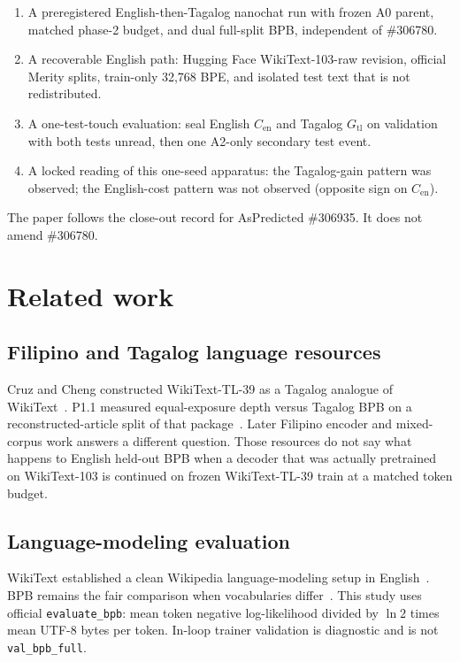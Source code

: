 \documentclass[11pt,a4paper]{article}
\begin{document}
\begin{enumerate}
\item A preregistered English-then-Tagalog nanochat run with frozen A0 parent, matched phase-2 budget, and dual full-split BPB, independent of \#306780.
\item A recoverable English path: Hugging Face WikiText-103-raw revision, official Merity splits, train-only 32{,}768 BPE, and isolated test text that is not redistributed.
\item A one-test-touch evaluation: seal English $C_{\mathrm{en}}$ and Tagalog $G_{\mathrm{tl}}$ on validation with both tests unread, then one A2-only secondary test event.
\item A locked reading of this one-seed apparatus: the Tagalog-gain pattern was observed; the English-cost pattern was not observed (opposite sign on $C_{\mathrm{en}}$).
\end{enumerate}

The paper follows the close-out record for AsPredicted \#306935. It does not amend \#306780.

\section{Related work}
\label{sec:related}

\subsection{Filipino and Tagalog language resources}
Cruz and Cheng constructed WikiText-TL-39 as a Tagalog analogue of WikiText~\cite{cruz2019eval}. P1.1 measured equal-exposure depth versus Tagalog BPB on a reconstructed-article split of that package~\cite{pajo2026p11,aspredicted306780}. Later Filipino encoder and mixed-corpus work answers a different question. Those resources do not say what happens to English held-out BPB when a decoder that was actually pretrained on WikiText-103 is continued on frozen WikiText-TL-39 train at a matched token budget.

\subsection{Language-modeling evaluation}
WikiText established a clean Wikipedia language-modeling setup in English~\cite{merity2017pointer}. BPB remains the fair comparison when vocabularies differ~\cite{shannon1951prediction,melis2018eval,brown2020gpt3}. This study uses official \texttt{evaluate\_bpb}: mean token negative log-likelihood divided by $\ln 2$ times mean UTF-8 bytes per token. In-loop trainer validation is diagnostic and is not \texttt{val\_bpb\_full}.
\end{document}
